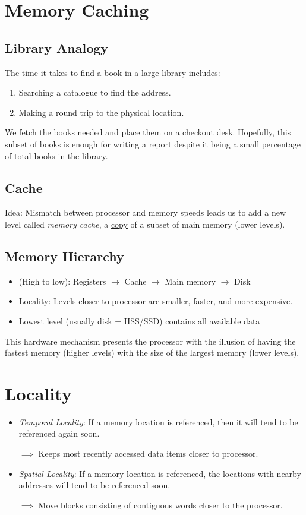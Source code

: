 \section{Memory Caching}
\subsection{Library Analogy}
The time it takes to find a book in a large library includes:
\begin{enumerate}
	\item Searching a catalogue to find the address.
	\item Making a round trip to the physical location.
\end{enumerate}

We fetch the books needed and place them on a checkout desk. Hopefully, this subset of books is enough for writing a report despite it being a small percentage of total books in the library.

\subsection{Cache}
Idea: Mismatch between processor and memory speeds leads us to add a new level called \emph{memory cache}, a \underline{copy} of a subset of main memory (lower levels).

\subsection{Memory Hierarchy}
\begin{itemize}
    \item (High to low): Registers $\rightarrow$ Cache $\rightarrow$ Main memory $\rightarrow$ Disk
    \item Locality: Levels closer to processor are smaller, faster, and more expensive.
    \item Lowest level (usually disk = HSS/SSD) contains all available data
\end{itemize}

This hardware mechanism presents the processor with the illusion of having the fastest memory (higher levels) with the size of the largest memory (lower levels).

\section{Locality}
\begin{itemize}
    \item \emph{Temporal Locality}: If a memory location is referenced, then it will tend to be referenced again soon. 
    
    $\implies$ Keeps most recently accessed data items closer to processor.
    
    \item \emph{Spatial Locality}: If a memory location is referenced, the locations with nearby addresses will tend to be referenced soon.
    
    $\implies$ Move blocks consisting of contiguous words closer to the processor.
\end{itemize}

